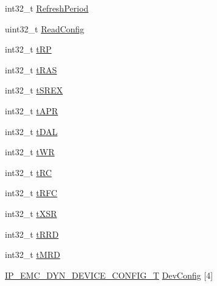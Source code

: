 \begin{DoxyCompactItemize}
\item 
int32\+\_\+t \hyperlink{struct_i_p___e_m_c___d_y_n___c_o_n_f_i_g___t_a47d9c97198af7993a8f477512cd782cf}{Refresh\+Period}
\item 
uint32\+\_\+t \hyperlink{struct_i_p___e_m_c___d_y_n___c_o_n_f_i_g___t_a76b76d1dc1cfb73c316fb127935181e6}{Read\+Config}
\item 
int32\+\_\+t \hyperlink{struct_i_p___e_m_c___d_y_n___c_o_n_f_i_g___t_a26d402aa7f6438e5ce124d1c4aa6db90}{t\+RP}
\item 
int32\+\_\+t \hyperlink{struct_i_p___e_m_c___d_y_n___c_o_n_f_i_g___t_a27c345960642ecd5d952226b67716018}{t\+R\+AS}
\item 
int32\+\_\+t \hyperlink{struct_i_p___e_m_c___d_y_n___c_o_n_f_i_g___t_a142118a0bc5af59b2f620cf91d25d33e}{t\+S\+R\+EX}
\item 
int32\+\_\+t \hyperlink{struct_i_p___e_m_c___d_y_n___c_o_n_f_i_g___t_a42d3ffbf4505ece7a1dcacedf1bafdd6}{t\+A\+PR}
\item 
int32\+\_\+t \hyperlink{struct_i_p___e_m_c___d_y_n___c_o_n_f_i_g___t_a63697e010db070a2206e8a7af67349b8}{t\+D\+AL}
\item 
int32\+\_\+t \hyperlink{struct_i_p___e_m_c___d_y_n___c_o_n_f_i_g___t_a6e616990a47db6cc19ed8069336a9a06}{t\+WR}
\item 
int32\+\_\+t \hyperlink{struct_i_p___e_m_c___d_y_n___c_o_n_f_i_g___t_ae14468583bf6b934a846faca9f4ce71a}{t\+RC}
\item 
int32\+\_\+t \hyperlink{struct_i_p___e_m_c___d_y_n___c_o_n_f_i_g___t_a03de5aced816218caee3e8dcaf8a42ef}{t\+R\+FC}
\item 
int32\+\_\+t \hyperlink{struct_i_p___e_m_c___d_y_n___c_o_n_f_i_g___t_ae0ecf804a46e12e638905cd3bef2de71}{t\+X\+SR}
\item 
int32\+\_\+t \hyperlink{struct_i_p___e_m_c___d_y_n___c_o_n_f_i_g___t_a6b842094338ef3f052cedc04b0b68ae7}{t\+R\+RD}
\item 
int32\+\_\+t \hyperlink{struct_i_p___e_m_c___d_y_n___c_o_n_f_i_g___t_a245e7ecbfe89077532e110d02af2f901}{t\+M\+RD}
\item 
\hyperlink{struct_i_p___e_m_c___d_y_n___d_e_v_i_c_e___c_o_n_f_i_g___t}{I\+P\+\_\+\+E\+M\+C\+\_\+\+D\+Y\+N\+\_\+\+D\+E\+V\+I\+C\+E\+\_\+\+C\+O\+N\+F\+I\+G\+\_\+T} \hyperlink{struct_i_p___e_m_c___d_y_n___c_o_n_f_i_g___t_a57b1df2b47c607c29b88fd8542f1e9d5}{Dev\+Config} \mbox{[}4\mbox{]}
\end{DoxyCompactItemize}


